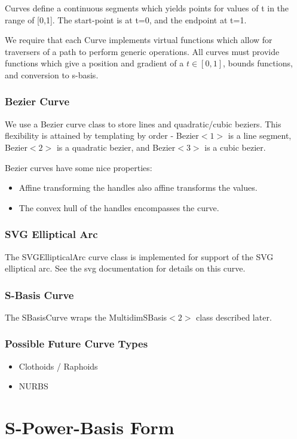 \documentclass{book}
\newcommand{\code}[1]{\textsf{#1}}
\begin{document}
Curves define a continuous segments which yields points for values of
t in the range of [0,1].  The start-point is at t=0, and the endpoint
at t=1.

We require that each \code{Curve} implements virtual functions which
allow for traversers of a path to perform generic operations.  All
curves must provide functions which give a position and gradient of a
$t \in [0,1]$, bounds functions, and conversion to s-basis.

\subsection{Bezier Curve}
We use a \code{Bezier} curve class to store lines and quadratic/cubic
beziers.  This flexibility is attained by templating by order -
\code{Bezier$<1>$} is a line segment, \code{Bezier$<2>$} is a quadratic
bezier, and \code{Bezier$<3>$} is a cubic bezier.

Bezier curves have some nice properties:
\begin{itemize}
\item Affine transforming the handles also affine transforms the values.
\item The convex hull of the handles encompasses the curve.
\end{itemize}

\subsection{SVG Elliptical Arc}
The \code{SVGEllipticalArc} curve class is implemented for support of
the SVG elliptical arc.  See the svg documentation for details on this
curve.

\subsection{S-Basis Curve}
The \code{SBasisCurve} wraps the \code{MultidimSBasis$<2>$} class
described later.

\subsection{Possible Future Curve Types}
\begin{itemize}
\item Clothoids / Raphoids
\item NURBS
\end{itemize}

\chapter{S-Power-Basis Form}
\end{document}
